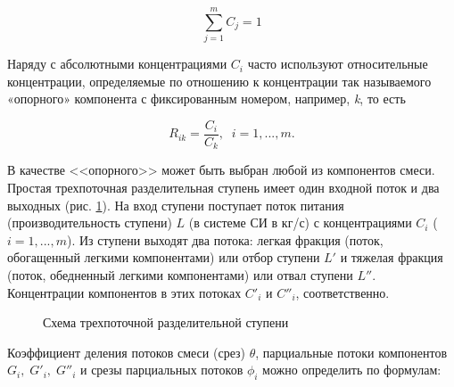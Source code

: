 \begin{equation} \label{GrindEQ__1_1_} 
  \sum _{j=1}^{m}C_{j}  =1 
\end{equation} 
  
Наряду с абсолютными концентрациями $C_{i} $ часто используют относительные концентрации, определяемые по отношению к концентрации так называемого «опорного» компонента с фиксированным номером, например, \textit{k}, то есть

\begin{equation} \label{GrindEQ__1_2_} 
  R_{ik} =\frac{C_{i} }{C_{k} } ,\;\;  i=1,...,m.             
\end{equation} 
  
В качестве <<опорного>> может быть выбран любой из компонентов смеси. 
Простая трехпоточная разделительная ступень имеет один входной поток и два выходных (рис. \ref{1_1}). На вход ступени поступает поток питания (производительность ступени) $L$  (в системе СИ в кг/с) с концентрациями $C_{i}$ ($i=1,...,m$). Из ступени выходят два потока: легкая фракция (поток, обогащенный легкими компонентами) или отбор ступени $L'$ и тяжелая фракция (поток, обедненный легкими компонентами) или отвал ступени $L''$. Концентрации компонентов в этих потоках  $C'_{i} $ и $C''_{i} $, соответственно.

\begin{figure}[ht]
  \caption{Схема трехпоточной разделительной ступени}\label{1_1}
\end{figure}

Коэффициент деления потоков смеси (срез) $\theta$, парциальные потоки компонентов $G_{i} ,\; G'_{i} ,\; G''_{i}$ и срезы парциальных потоков $\phi _{i}$ можно определить по формулам:

